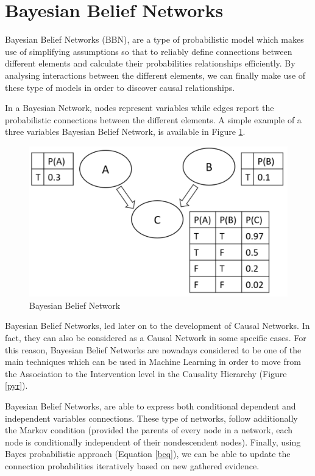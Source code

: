 \section{Bayesian Belief Networks}
\label{bbn_ref}
Bayesian Belief Networks (BBN), are a type of probabilistic model which makes use of simplifying assumptions so that to reliably define connections between different elements and calculate their probabilities relationships efficiently. By analysing interactions between the different elements, we can finally make use of these type of models in order to discover causal relationships. 

In a Bayesian Network, nodes represent variables while edges report the probabilistic connections between the different elements. A simple example of a three variables Bayesian Belief Network, is available in Figure \ref{net}. 

\vspace{-0.5cm}
\begin{figure}[ht!]%
    \centering
    \includegraphics[width=0.7\linewidth]{latex/images/bayes.pdf}
    \vspace{-0.2cm}
    \caption{Bayesian Belief Network}
    \label{net}
\end{figure}
\vspace{-0.7cm}

Bayesian Belief Networks, led later on to the development of Causal Networks. In fact, they can also be considered as a Causal Network in some specific cases. For this reason, Bayesian Belief Networks are nowadays considered to be one of the main techniques which can be used in Machine Learning in order to move from the Association to the Intervention level in the Causality Hierarchy (Figure \ref{pyr}).

Bayesian Belief Networks, are able to express both conditional dependent and independent variables connections. These type of networks, follow additionally the Markov condition \cite{markov} (provided the parents of every node in a network, each node is conditionally independent of their nondescendent nodes).  Finally, using Bayes probabilistic approach (Equation \ref{beq}), we can be able to update the connection probabilities iteratively based on new gathered evidence.

